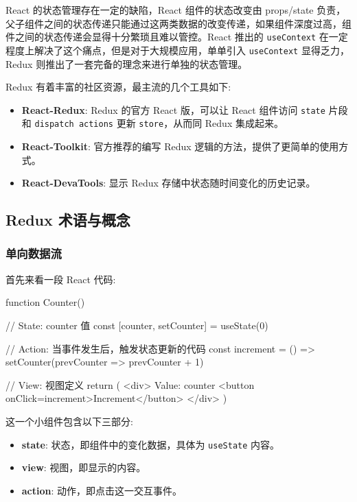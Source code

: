 React 的状态管理存在一定的缺陷，React 组件的状态改变由 props/state 负责，父子组件之间的状态传递只能通过这两类数据的改变传递，如果组件深度过高，组件之间的状态传递会显得十分繁琐且难以管控。React 推出的 \texttt{useContext} 在一定程度上解决了这个痛点，但是对于大规模应用，单单引入 \texttt{useContext} 显得乏力，Redux 则推出了一套完备的理念来进行单独的状态管理。

Redux 有着丰富的社区资源，最主流的几个工具如下:

\begin{itemize}
  \item \textbf{React-Redux}: Redux 的官方 React 版，可以让 React 组件访问 \texttt{state} 片段和 \texttt{dispatch actions} 更新 \texttt{store}，从而同 Redux 集成起来。
  \item \textbf{React-Toolkit}: 官方推荐的编写 Redux 逻辑的方法，提供了更简单的使用方式。
  \item \textbf{React-DevaTools}: 显示 Redux 存储中状态随时间变化的历史记录。
\end{itemize}

\subsection{Redux 术语与概念}

\subsubsection{单向数据流}

首先来看一段 React 代码:

\begin{JavaScript}
function Counter() {
  // State: counter 值
  const [counter, setCounter] = useState(0)

  // Action: 当事件发生后，触发状态更新的代码
  const increment = () => {
    setCounter(prevCounter => prevCounter + 1)
  }

  // View: 视图定义
  return (
    <div>
      Value: {counter} <button onClick={increment}>Increment</button>
    </div>
  )
}
\end{JavaScript}

这一个小组件包含以下三部分:
\begin{itemize}
  \item \textbf{state}: 状态，即组件中的变化数据，具体为 \texttt{useState} 内容。
  \item \textbf{view}: 视图，即显示的内容。
  \item \textbf{action}: 动作，即点击这一交互事件。
\end{itemize}


